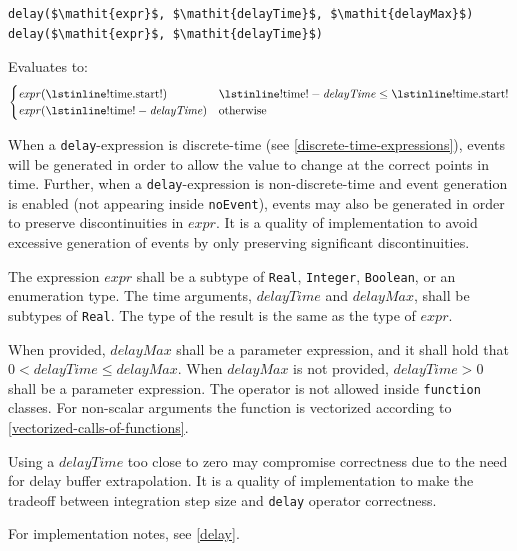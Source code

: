 \begin{operatordefinition}[delay]
\begin{synopsis}\begin{lstlisting}
delay($\mathit{expr}$, $\mathit{delayTime}$, $\mathit{delayMax}$)
delay($\mathit{expr}$, $\mathit{delayTime}$)
\end{lstlisting}\end{synopsis}
\begin{semantics}
Evaluates to:
\begin{equation*}
\begin{cases}
\mathit{expr}(\text{\lstinline!time.start!}) & \text{\lstinline!time!} - \mathit{delayTime} \leq \text{\lstinline!time.start!}\\
\mathit{expr}(\text{\lstinline!time!} - \mathit{delayTime}) & \text{otherwise}
\end{cases}
\end{equation*}

When a \lstinline!delay!-expression is discrete-time (see \cref{discrete-time-expressions}), events will be generated in order to allow the value to change at the correct points in time.
Further, when a \lstinline!delay!-expression is non-discrete-time and event generation is enabled (not appearing inside \lstinline!noEvent!), events may also be generated in order to preserve discontinuities in $\mathit{expr}$.
It is a quality of implementation to avoid excessive generation of events by only preserving significant discontinuities.

The expression $\mathit{expr}$ shall be a subtype of \lstinline!Real!, \lstinline!Integer!, \lstinline!Boolean!, or an enumeration type.
The time arguments, $\mathit{delayTime}$ and $\mathit{delayMax}$, shall be subtypes of \lstinline!Real!.
The type of the result is the same as the type of $\mathit{expr}$.

When provided, $\mathit{delayMax}$ shall be a parameter expression, and it shall hold that $0 < \mathit{delayTime} \leq \mathit{delayMax}$.
When $\mathit{delayMax}$ is not provided, $\mathit{delayTime} > 0$ shall be a parameter expression.
The operator is not allowed inside \lstinline!function! classes.
For non-scalar arguments the function is vectorized according to \cref{vectorized-calls-of-functions}.

Using a $\mathit{delayTime}$ too close to zero may compromise correctness due to the need for delay buffer extrapolation.
It is a quality of implementation to make the tradeoff between integration step size and \lstinline!delay! operator correctness.

For implementation notes, see \cref{delay}.
\end{semantics}
\end{operatordefinition}

